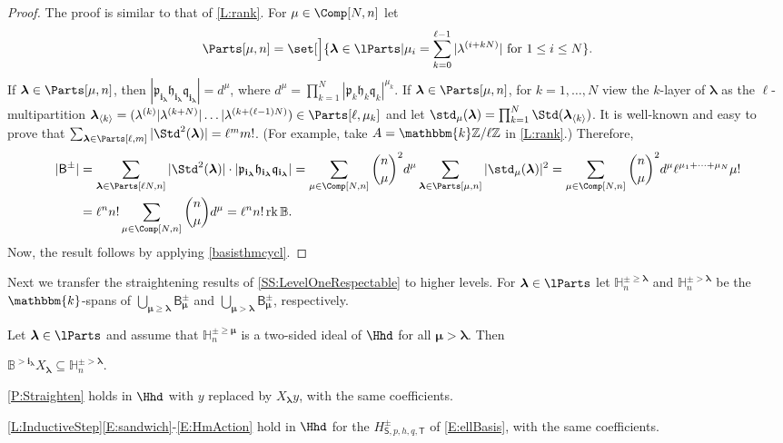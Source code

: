 \documentclass[a4paper,11pt]{amsart}
\newcommand\blam{{\boldsymbol\lambda}}
\newcommand\bmu{{\boldsymbol\mu}}
\newcommand\bi{\mathbf{i}}
\newcommand\ilam[1][\blam]{\bi_{#1}}
\numberwithin{equation}{subsection}
\theoremstyle{definition}
\theoremstyle{theorem}
\theoremstyle{remark}
\newcommand\plam[1][\lambda]{\mathfrak{p}_{#1}}
\newcommand\hlam[1][\lambda]{\mathfrak{h}_{#1}}
\newcommand\qlam[1][\lambda]{\mathfrak{q}_{#1}}
\newcommand\HH{\mathbb{H}}
\newcommand\Basis[1][\pm]{\mathsf{B}^{#1}}
\newcommand\bS{{\mathsf{S}}}
\newcommand\bT{{\mathsf{T}}}
\newcommand\op{\operatorname}
\newcommand\kk{\mathbbm{k}}
\newcommand\Z{\mathbb{Z}}
\newcommand{\Bo}{\mathbb{B}}
\begin{document}
\begin{proof}
  The proof is similar to that of \autoref{L:rank}. For $\mu\in\Comp[N,n]$ let
  \[
    \Parts[\mu,n]=\set[\Big]{\blam\in\lParts|{\mu_i=\sum_{k=0}^{\ell-1}|\lambda^{(i+kN)}|}
         \text{ for }1\le i\le N}.
  \]
  If $\blam\in\Parts[\mu,n]$, then $|\plam[\ilam]\hlam[\ilam]\qlam[\ilam]|=d^\mu$,
where $d^\mu=\prod_{k=1}^N|\plam[k]\hlam[k]\qlam[k]|^{\mu_k}$. If
  $\blam\in\Parts[\mu,n]$, for $k=1,\dots,N$ {view the $k$-layer of $\blam$ as the $\ell$-multipartition
  $\blam_{\langle k\rangle}=(\lambda^{(k)}|\lambda^{(k+N)}|\dots|\lambda^{(k+(\ell-1)N)})\in\Parts[\ell,\mu_k]$}
  and let $\std_\mu(\blam)=\prod_{k=1}^N\Std({\blam_{\langle k\rangle}})$.
  It is well-known and easy to prove that
  $\sum_{\blam\in\Parts[\ell,m]}|\Std^2(\blam)|=\ell^mm!$.
  (For example, take $A=\kk \Z/\ell\Z$ in \autoref{L:rank}.) Therefore,
  \begin{align*}
    |\Basis| & = \sum_{\blam\in\Parts[\ell N,n]}
                    |\Std^2(\blam)|\cdot|\plam[\ilam]\hlam[\ilam]\qlam[\ilam]|
         =\sum_{\mu\in\Comp[N,n]}{\binom n\mu}^2d^\mu
           \sum_{\blam\in\Parts[\mu,n]}|\std_\mu(\blam)|^2
=\sum_{\mu\in\Comp[N,n]}{\binom n\mu}^2d^\mu \ell^{\mu_1+\dots+\mu_N}\mu!\\
        & =\ell^nn!\sum_{\mu\in\Comp[N,n]}{\binom n\mu}d^\mu
         =\ell^nn!\op{rk}{\Bo}.
  \end{align*}
  Now, the result follows by applying \autoref{basisthmcycl}.
\end{proof}

Next we transfer the straightening results of \autoref{SS:LevelOneRespectable} to higher
levels. For $\blam\in\lParts$ let $\HH^{\pm\ge\blam}_n$ and $\HH^{\pm>\blam}_n$ be the $\kk$-spans
of $\bigcup_{\bmu\ge\blam}\Basis_\bmu$ and $\bigcup_{\bmu>\blam}\Basis_\bmu$, respectively.

\begin{Lemma}\label{L:ColumnStandard}
  Let $\blam\in\lParts$ and assume that $\HH^{\pm\ge\bmu}_n$ is a two-sided ideal of $\Hhd$
  for all $\bmu>\blam$. Then
  \begin{thmenumerate}
  \item\label{ellBoInIdeal} $\Bo^{>\ilam}X_\blam\subseteq\HH^{\pm>\blam}_n$.
  \item\label{ellStraighten} \autoref{P:Straighten} holds in
    $\Hhd$ with $y$ replaced by $X_\blam y$, with the same coefficients.
  \item\label{ellInductive} \autoref{L:InductiveStep}\autoref{E:sandwich}-\autoref{E:HmAction} hold in $\Hhd$ for the $H^\pm_{\bS,p,h,q,\bT}$ of
    \autoref{E:ellBasis}, with the same coefficients.
  \end{thmenumerate}
\end{Lemma}
\end{document}
